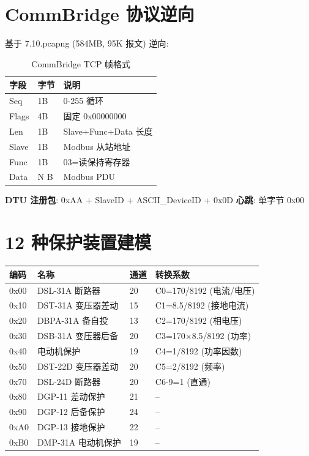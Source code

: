 \documentclass[12pt,a4paper]{ctexart}
\begin{document}
\section{CommBridge 协议逆向}

基于 7.10.pcapng (584MB, 95K 报文) 逆向:

\begin{table}[H]\centering
\caption{CommBridge TCP 帧格式}
\begin{tabular}{lll}
\toprule
\textbf{字段} & \textbf{字节} & \textbf{说明} \\
\midrule
Seq & 1B & 0-255 循环 \\
Flags & 4B & 固定 0x00000000 \\
Len & 1B & Slave+Func+Data 长度 \\
Slave & 1B & Modbus 从站地址 \\
Func & 1B & 03=读保持寄存器 \\
Data & N B & Modbus PDU \\
\bottomrule
\end{tabular}
\end{table}

\textbf{DTU 注册包}: 0xAA + SlaveID + ASCII\_DeviceID + 0x0D
\textbf{心跳}: 单字节 0x00

\section{12 种保护装置建模}

\begin{longtable}{llll}
\toprule
\textbf{编码} & \textbf{名称} & \textbf{通道} & \textbf{转换系数} \\
\midrule
0x00 & DSL-31A 断路器 & 20 & C0=170/8192 (电流/电压) \\
0x10 & DST-31A 变压器差动 & 15 & C1=8.5/8192 (接地电流) \\
0x20 & DBPA-31A 备自投 & 13 & C2=170/8192 (相电压) \\
0x30 & DSB-31A 变压器后备 & 20 & C3=170×8.5/8192 (功率) \\
0x40 & 电动机保护 & 19 & C4=1/8192 (功率因数) \\
0x50 & DST-22D 变压器差动 & 20 & C5=2/8192 (频率) \\
0x70 & DSL-24D 断路器 & 20 & C6-9=1 (直通) \\
0x80 & DGP-11 差动保护 & 21 & -- \\
0x90 & DGP-12 后备保护 & 24 & -- \\
0xA0 & DGP-13 接地保护 & 22 & -- \\
0xB0 & DMP-31A 电动机保护 & 19 & -- \\
\bottomrule
\end{longtable}
\end{document}
